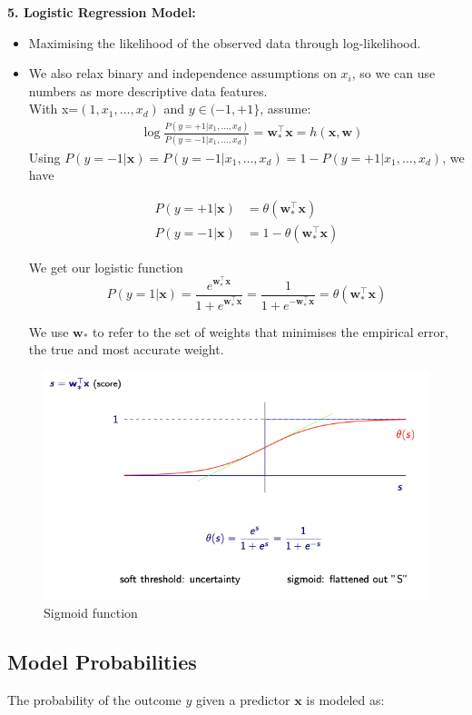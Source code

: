 \textbf{5. Logistic Regression Model:}
\begin{itemize}
    \item Maximising the likelihood of the observed data through log-likelihood.
    \item We also relax binary and independence assumptions on $x_i$, so we can use numbers as more descriptive data features.\\

    With x=$(1,x_1,\ldots,x_d)$ and $y\in(-1,+1\}$, assume: 
    \begin{align*}&\log\frac{P(y=+1|x_1,\ldots,x_d)}{P(y=-1|x_1,\ldots,x_d)}=\mathbf{w}_*^\top\mathbf{x}=h(\mathbf{x},\mathbf{w})\end{align*}
    Using $P(y=-1|\mathbf{x})=P(y=-1|x_1,\ldots,x_d)=1-P(y=+1|x_1,\ldots,x_d)$, we have
    
    \begin{align*}
P(y=+1|\mathbf{x})&=\theta(\mathbf{w}_*^\top\mathbf{x})\\
    P(y=-1|\mathbf{x})&=1-\theta(\mathbf{w}_*^\top\mathbf{x})
    \end{align*}

    We get our logistic function
    \[P(y=1|\mathbf{x})=\frac{e^{\mathbf{w}_*^\top\mathbf{x}}}{1+e^{\mathbf{w}_*^\top\mathbf{x}}}=\frac1{1+e^{-\mathbf{w}_*^\top\mathbf{x}}}=\theta(\mathbf{w}_*^\top\mathbf{x})\]
    
We use $\mathbf{w}_*$ to refer to the set of weights that minimises the empirical error, the true and most accurate weight.
    
\end{itemize}
\begin{figure}[H]
    \centering
    \includegraphics[width=0.75\linewidth]{img/sigmoid.png}
    \caption{Sigmoid function}
    \label{fig:sigmoid-label}
\end{figure}
\subsection{Model Probabilities}
The probability of the outcome \( y \) given a predictor \( \mathbf{x} \) is modeled as:

